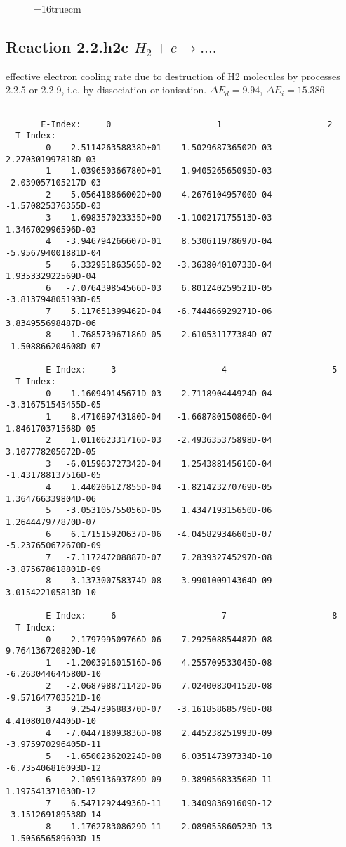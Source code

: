 \documentclass[12pt,dvipdfmx]{article}
\begin{document}
\begin{figure} \label{2.1.8ro}
\epsfxsize=16truecm
\end{figure}
\newpage

\subsection{
  Reaction 2.2.h2c $H_2 + e \rightarrow  ....$
}

   effective electron cooling rate due to destruction of H2 molecules by
   processes 2.2.5 or 2.2.9, i.e. by dissociation or ionisation.
$\Delta E_d = 9.94$, $\Delta E_i = 15.386$


\begin{small}\begin{verbatim}

       E-Index:     0                     1                     2
  T-Index:
        0   -2.511426358838D+01   -1.502968736502D-03    2.270301997818D-03
        1    1.039650366780D+01    1.940526565095D-03   -2.039057105217D-03
        2   -5.056418866002D+00    4.267610495700D-04   -1.570825376355D-03
        3    1.698357023335D+00   -1.100217175513D-03    1.346702996596D-03
        4   -3.946794266607D-01    8.530611978697D-04   -5.956794001881D-04
        5    6.332951863565D-02   -3.363804010733D-04    1.935332922569D-04
        6   -7.076439854566D-03    6.801240259521D-05   -3.813794805193D-05
        7    5.117651399462D-04   -6.744466929271D-06    3.834955698487D-06
        8   -1.768573967186D-05    2.610531177384D-07   -1.508866204608D-07

        E-Index:     3                     4                     5
  T-Index:
        0   -1.160949145671D-03    2.711890444924D-04   -3.316751545455D-05
        1    8.471089743180D-04   -1.668780150866D-04    1.846170371568D-05
        2    1.011062331716D-03   -2.493635375898D-04    3.107778205672D-05
        3   -6.015963727342D-04    1.254388145616D-04   -1.431788137516D-05
        4    1.440206127855D-04   -1.821423270769D-05    1.364766339804D-06
        5   -3.053105755056D-05    1.434719315650D-06    1.264447977870D-07
        6    6.171515920637D-06   -4.045829346605D-07   -5.237650672670D-09
        7   -7.117247208887D-07    7.283932745297D-08   -3.875678618801D-09
        8    3.137300758374D-08   -3.990100914364D-09    3.015422105813D-10

        E-Index:     6                     7                     8
  T-Index:
        0    2.179799509766D-06   -7.292508854487D-08    9.764136720820D-10
        1   -1.200391601516D-06    4.255709533045D-08   -6.263044644580D-10
        2   -2.068798871142D-06    7.024008304152D-08   -9.571647703521D-10
        3    9.254739688370D-07   -3.161858685796D-08    4.410801074405D-10
        4   -7.044718093836D-08    2.445238251993D-09   -3.975970296405D-11
        5   -1.650023620224D-08    6.035147397334D-10   -6.735406816093D-12
        6    2.105913693789D-09   -9.389056833568D-11    1.197541371030D-12
        7    6.547129244936D-11    1.340983691609D-12   -3.151269189538D-14
        8   -1.176278308629D-11    2.089055860523D-13   -1.505656589693D-15


\end{verbatim}
\end{small}
\end{document}
